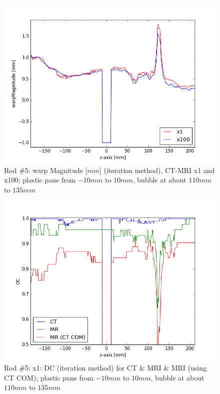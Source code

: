 \begin{figure}[!tbh]
    \centering
    \includegraphics[scale=0.6]{../fig/python/ph2/warp/warpMagnitude_x1-100_iter.png}
    \caption{Rod \#5: warp Magnitude [$mm$] (iteration method), CT-MRI x1 and x100; plastic pane from $-10mm$ to $10mm$, bubble at about $110mm$ to $135mm$}
    \label{fig:ph2_warpMagnitude_x1-100}
\end{figure}

\begin{figure}[!bth]
    \centering
    \includegraphics[scale=0.6]{../fig/python/ph2/dice/ph2_DC_x1_iter.png}
    \caption{Rod \#5; x1: DC (iteration method) for CT \& MRI \& MRI (using CT COM); plastic pane from $-10mm$ to $10mm$, bubble at about $110mm$ to $135mm$}
    \label{fig:ph2_DC_x1}
\end{figure}

